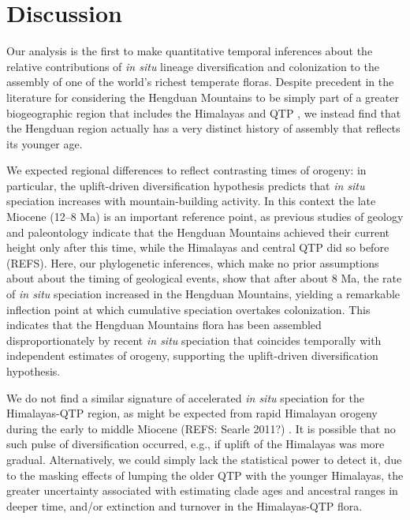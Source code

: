 \section{Discussion}

Our analysis is the first to make quantitative temporal inferences about the relative contributions of \textit{in situ} lineage diversification and colonization to the assembly of one of the world's richest temperate floras. Despite precedent in the literature for considering the Hengduan Mountains to be simply part of a greater biogeographic region that includes the Himalayas and QTP \citep[e.g.][]{Zhang2014,Nie2013,GaoY2013,Matuszak2016}, we instead find that the Hengduan region actually has a very distinct history of assembly that reflects its younger age.

We expected regional differences to reflect contrasting times of orogeny: in particular, the uplift-driven diversification hypothesis predicts that \textit{in situ} speciation increases with mountain-building activity. In this context the late Miocene (12--8 Ma) is an important reference point, as previous studies of geology and paleontology indicate that the Hengduan Mountains achieved their current height only after this time, while the Himalayas and central QTP did so before (REFS). Here, our phylogenetic inferences, which make no prior assumptions about about the timing of geological events, show that after about 8 Ma, the rate of \textit{in situ} speciation increased in the Hengduan Mountains, yielding a remarkable inflection point at which cumulative speciation overtakes colonization. This indicates that the Hengduan Mountains flora has been assembled disproportionately by recent \textit{in situ} speciation that coincides temporally with independent estimates of orogeny, supporting the uplift-driven diversification hypothesis.

We do not find a similar signature of accelerated \textit{in situ} speciation for the Himalayas-QTP region, as might be expected from rapid Himalayan orogeny during the early to middle Miocene (REFS: Searle 2011?)  %
. It is possible that no such pulse of diversification occurred, e.g., if uplift of the Himalayas was more gradual. Alternatively, we could simply lack the statistical power to detect it, due to the masking effects of lumping the older QTP with the younger Himalayas, the greater uncertainty associated with estimating clade ages and ancestral ranges in deeper time, and/or extinction and turnover in the Himalayas-QTP flora.

